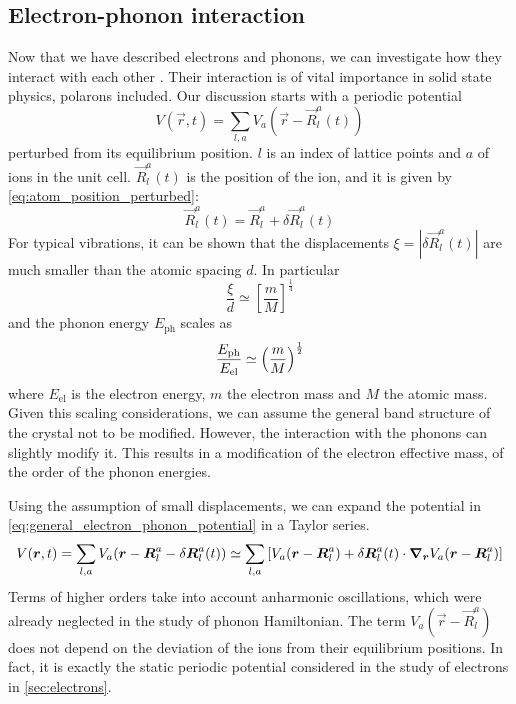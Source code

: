 \subsection{Electron-phonon interaction} \label{sec:electrons_phonons_interaction}
Now that we have described electrons and phonons, we can investigate how they interact with each other \cite{cohenFundamentalsCondensedMatter, tempere}. Their interaction is of vital importance in solid state physics, polarons included. Our discussion starts with a periodic potential
\begin{equation} \label{eq:general_electron_phonon_potential}
    V(\vec{r}, t) = \sum_{l,a} V_a(\vec{r} - \vec{R}_l^a(t))
\end{equation}
perturbed from its equilibrium position. $l$ is an index of lattice points and $a$ of ions in the unit cell. $\vec{R}_l^a(t)$ is the position of the ion, and it is given by \cref{eq:atom_position_perturbed}:
\begin{equation}
    \vec{R}_l^a(t) = \vec{R}_l^a + \delta \vec{R}_l^a(t)
\end{equation}
For typical vibrations, it can be shown that the displacements $\xi = |\delta \vec{R}_l^a(t)|$ are much smaller than the atomic spacing $d$. In particular
\begin{equation}
    \frac{\xi}{d} \simeq \left[ \frac{m}{M} \right]^\frac{1}{4}
\end{equation}
and the phonon energy $E_\text{ph}$ scales as
\begin{equation}
    \frac{E_\text{ph}}{E_\text{el}} \simeq \left( \frac{m}{M} \right)^{\frac{1}{2}}
\end{equation}
where $E_\text{el}$ is the electron energy, $m$ the electron mass and $M$ the atomic mass. Given this scaling considerations, we can assume the general band structure of the crystal not to be modified. However, the interaction with the phonons can slightly modify it. This results in a modification of the electron effective mass, of the order of the phonon energies.

Using the assumption of small displacements, we can expand the potential in \cref{eq:general_electron_phonon_potential} in a Taylor series.
\begin{multline}
    V(\mathbf{\boldsymbol{r}}, t) = \sum_{l,a} V_a(\mathbf{\boldsymbol{r}} - \mathbf{\boldsymbol{R}}_l^a - \delta \mathbf{\boldsymbol{R}}_l^a(t))
    \simeq \sum_{l,a} \left[ V_a(\mathbf{\boldsymbol{r}} - \mathbf{\boldsymbol{R}}_l^a) + \delta \mathbf{\boldsymbol{R}}_l^a(t) \cdot \grad_{\mathbf{\boldsymbol{r}}} V_a(\mathbf{\boldsymbol{r}} - \mathbf{\boldsymbol{R}}_l^a) \right]
\end{multline}
Terms of higher orders take into account anharmonic oscillations, which were already neglected in the study of phonon Hamiltonian. The term $V_a(\vec{r} - \vec{R}_l^a)$ does not depend on the deviation of the ions from their equilibrium positions. In fact, it is exactly the static periodic potential considered in the study of electrons in \cref{sec:electrons}.

